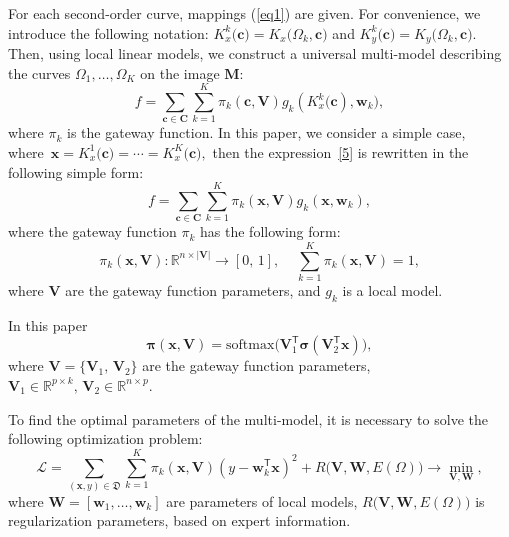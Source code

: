 For each second-order curve, mappings (\ref{eq1}) are given. For convenience, we introduce the following notation: $K_x^k\bigr(\mathbf{c}\bigr) = K_x\bigr(\Omega_k, \mathbf{c}\bigr)$ and $K_y^k\bigr(\mathbf{c}\bigr) = K_y\bigr(\Omega_k, \mathbf{c}\bigr)$. Then, using local linear models, we construct a universal multi-model describing the curves $\Omega_1, \dots, \Omega_K$ on the image $\mathbf{M}$:
\begin{equation}
\label{5}
	f = \sum\limits_{\mathbf{c} \in \mathbf{C}} \sum_{k = 1}^{K} \pi_k(\mathbf{c}, \mathbf{V})g_k(K^k_{x}\bigl(\mathbf{c}), \mathbf{w}_k), 
\end{equation}
where $\pi_k$ is the  gateway function. In this paper, we consider a simple case, where~$\mathbf{x}=K^1_{x}\bigl(\mathbf{c})=\cdots=K^K_{x}\bigl(\mathbf{c}),$ then the expression~\eqref{5} is rewritten in the following simple form:
\begin{equation}
\label{5_1}
	f = \sum\limits_{\mathbf{c} \in \mathbf{C}} \sum_{k = 1}^{K} \pi_k(\mathbf{x}, \mathbf{V})g_k(\mathbf{x}, \mathbf{w}_k), 
\end{equation}
where the gateway function $\pi_k$ has the following form:
\begin{equation}
\label{6}
	\pi_k(\mathbf{x}, \mathbf{V}): \mathbb{R}^{n\times |\mathbf{V}|} \rightarrow [0, \, 1], \; \; \; \; \sum\limits_{k = 1}^{K}\pi_k(\mathbf{x}, \mathbf{V}) = 1,
\end{equation}
where $\mathbf{V}$ are the gateway function parameters, and $g_k$ is a local model.
    
In this paper
\begin{equation}
    \boldsymbol{\pi}(\mathbf{x}, \mathbf{V}) = \text{softmax}\bigl(\mathbf{V}_1^{\mathsf{T}}\boldsymbol{\sigma}(\mathbf{V}_2^{\mathsf{T}}\mathbf{x}) \bigr),
\end{equation}
where $\mathbf{V} = \{ \mathbf{V}_1, \, \mathbf{V}_2\}$ are the gateway function parameters,
$\mathbf{V}_1 \in \mathbb{R}^{p \times k}, \, \mathbf{V}_2 \in \mathbb{R}^{n \times p}$. 

To find the optimal parameters of the multi-model, it is necessary to solve the following optimization problem:
\begin{equation}\label{9}
\mathcal{L} = \sum\limits_{(\mathbf{x}, y) \in \mathfrak{D}} \sum\limits_{k = 1}^{K} \pi_k(\mathbf{x}, \mathbf{V})(y - \mathbf{w}_k^{\mathsf{T}}\mathbf{x})^2 + R\bigl(\mathbf{V}, \mathbf{W}, E(\Omega)\bigr) \rightarrow \min_{\mathbf{V}, \mathbf{W}},
\end{equation}
where $\mathbf{W} = [\mathbf{w}_1, \dots, \mathbf{w}_k]$ are  parameters of local models, $R\bigl(\mathbf{V}, \mathbf{W}, E(\Omega)\bigr)$ is regularization parameters, based on expert information.


